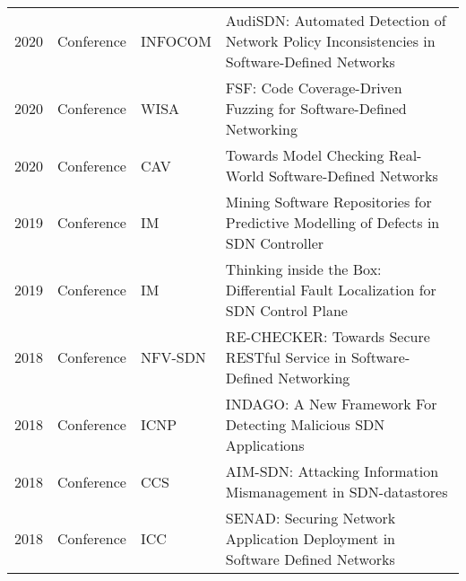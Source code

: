 \begin{appendices}
\begin{table}[ht!]
\begin{adjustbox}{width=\linewidth, center}
\begin{tabular}{llll}
2020          & Conference          & INFOCOM                      & AudiSDN: Automated Detection of Network Policy Inconsistencies in Software-Defined Networks\citep{9155378}                                                                     \\
2020          & Conference          & WISA                         & FSF: Code Coverage-Driven Fuzzing for Software-Defined Networking\citep{10.1007/978-3-030-39303-8_4}                                                                           \\
2020          & Conference          & CAV                          & Towards Model Checking Real-World Software-Defined Networks\citep{10.1007/978-3-030-53291-8_8}                                                                                 \\
2019          & Conference          & IM                           & Mining Software Repositories for Predictive Modelling of Defects in SDN Controller\citep{8717837}                                                                              \\
2019          & Conference          & IM                           & Thinking inside the Box: Differential Fault Localization for SDN Control Plane\citep{8717815}                                                                                  \\
2018          & Conference          & NFV-SDN                      & RE-CHECKER: Towards Secure RESTful Service in Software-Defined Networking\citep{8725649}                                                                                       \\
2018          & Conference          & ICNP                         & INDAGO: A New Framework For Detecting Malicious SDN Applications\citep{8526819}                                                                                                \\
2018          & Conference          & CCS                          & AIM-SDN: Attacking Information Mismanagement in SDN-datastores\citep{10.1145/3243734.3243799}                                                                                  \\
2018          & Conference          & ICC                          & SENAD: Securing Network Application Deployment in Software Defined Networks\citep{8422405}                                                                                     \\

\end{tabular}
\end{adjustbox}
\end{table}
\end{appendices}
